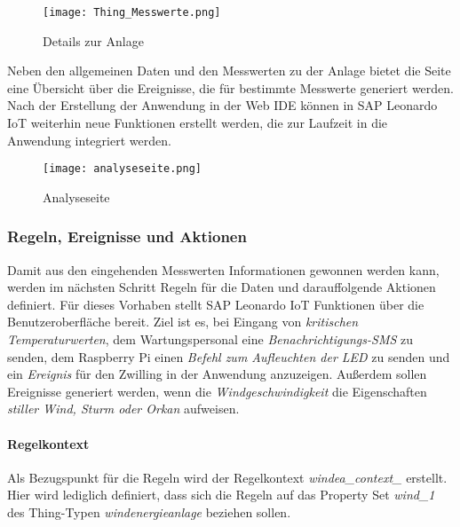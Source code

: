 \begin{figure}[H]
  \centering
  \texttt{[image: Thing\_Messwerte.png]}
  \caption{Details zur Anlage}
  \label{thingpage}
\end{figure}

\noindent Neben den allgemeinen Daten und den Messwerten zu der Anlage bietet die Seite eine Übersicht über die Ereignisse, die für bestimmte Messwerte generiert werden. Nach der Erstellung der Anwendung in der Web IDE können in SAP Leonardo IoT weiterhin neue Funktionen erstellt werden, die zur Laufzeit in die Anwendung integriert werden. 

\begin{figure}[H]
  \centering
  \texttt{[image: analyseseite.png]}
  \caption{Analyseseite}
  \label{analyse}
\end{figure}


\subsubsection{Regeln, Ereignisse und Aktionen}
Damit aus den eingehenden Messwerten Informationen gewonnen werden kann, werden im nächsten Schritt Regeln für die Daten und darauffolgende Aktionen definiert. Für dieses Vorhaben stellt SAP Leonardo IoT Funktionen über die Benutzeroberfläche bereit. Ziel ist es, bei Eingang von \textit{kritischen Temperaturwerten}, dem Wartungspersonal eine \textit{Benachrichtigungs-SMS} zu senden, dem Raspberry Pi einen \textit{Befehl zum Aufleuchten der LED} zu senden und ein \textit{Ereignis} für den Zwilling in der Anwendung anzuzeigen. Außerdem sollen Ereignisse generiert werden, wenn die \textit{Windgeschwindigkeit} die Eigenschaften \textit{stiller Wind, Sturm oder Orkan} aufweisen. 

\paragraph{Regelkontext}
Als Bezugspunkt für die Regeln wird der Regelkontext \textit{windea\_context\_} erstellt. Hier wird lediglich definiert, dass sich die Regeln auf das Property Set \textit{wind\_1} des Thing-Typen \textit{windenergieanlage} beziehen sollen.

